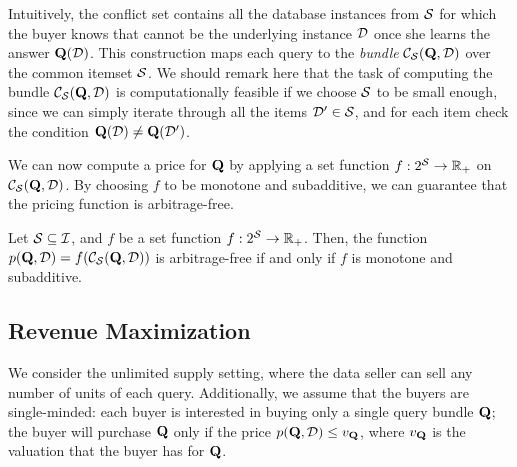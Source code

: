 Intuitively, the conflict set contains all the database instances from $\mathcal{S}$ for which the buyer knows that cannot be the underlying instance $\mathcal{D}$ once she learns the answer $\mathbf{Q}(\mathcal{D})$. This construction maps each query to the {\em  bundle} ${\mathcal{C}}_{\mathcal{S}}(\mathbf{Q},\mathcal{D}) $ over the common itemset $\mathcal{S}$. We should remark here that the task of computing the bundle ${\mathcal{C}}_{\mathcal{S}}(\mathbf{Q},\mathcal{D}) $ is computationally feasible if we choose $\mathcal{S}$ to be small enough, since we can simply iterate through all the items $\mathcal{D}' \in \mathcal{S}$, and for each item check the condition 
$\mathbf{Q}(\mathcal{D}) \neq \mathbf{Q}(\mathcal{D}')$.

We can now compute a price for $\mathbf{Q}$ by applying a set function $f: 2^{\mathcal{S}} \rightarrow  \mathbb{R}_+$ on ${\mathcal{C}}_{\mathcal{S}}(\mathbf{Q}, \mathcal{D})$. 
By choosing $f$ to be monotone and subadditive, we can guarantee that the pricing function is arbitrage-free.

\begin{theorem} \label{cor:arbitrage}
Let $\mathcal{S} \subseteq \mathcal{I}$, and $f$ be a set function $f: 2^{\mathcal{S}} \rightarrow  \mathbb{R}_+$. Then, the function $p(\mathbf{Q}, \mathcal{D}) = f({\mathcal{C}}_{\mathcal{S}}(\mathbf{Q}, \mathcal{D}))$ is arbitrage-free
if and only if  $f$ is monotone and subadditive. 
\end{theorem}

\subsection{Revenue Maximization}

We consider the unlimited supply setting, where the data seller can sell any number of units of each query. 
Additionally, we assume that the buyers are single-minded: each buyer is interested in buying only a single query bundle $\mathbf{Q}$; the buyer will purchase $\mathbf{Q}$ only if the price $p(\mathbf{Q}, \mathcal{D}) \leq v_{\mathbf{Q}}$, where $v_{\mathbf{Q}}$ is the valuation  that the buyer has for $\mathbf{Q}$. 

